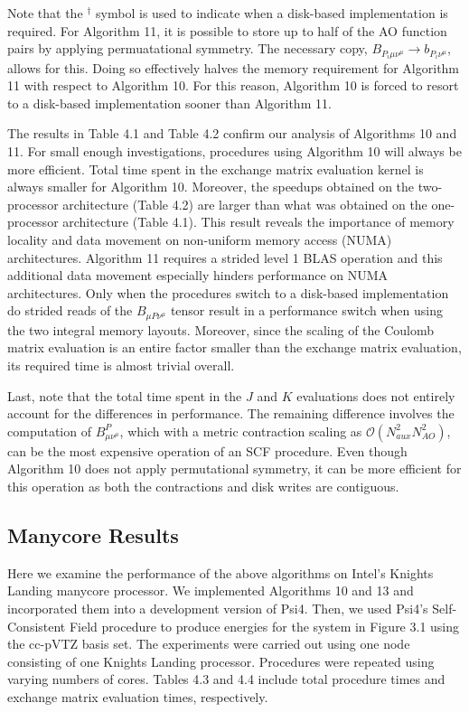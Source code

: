 Note that the $^{\dagger}$ symbol is used to indicate when a disk-based implementation is required. For Algorithm 11, it is possible
to store up to half of the AO function pairs by applying permuatational symmetry. The necessary copy, 
$B_{P_i \mu \nu^{\mu}} \rightarrow b_{P_i \nu^{\mu}}$, allows for this. Doing so effectively halves the memory requirement for Algorithm 11
with respect to Algorithm 10. For this reason, Algorithm 10 is forced to resort to a disk-based implementation sooner than Algorithm 11.

The results in Table 4.1 and Table 4.2 confirm our analysis of Algorithms 10 and 11. For small enough investigations, procedures using Algorithm 10 will always be more
efficient. Total time spent in the exchange matrix evaluation kernel is always smaller for Algorithm 10. 
Moreover, the speedups obtained on the two-processor architecture (Table 4.2) are larger than what was obtained on the one-processor architecture (Table 4.1).
This result reveals the importance of memory locality and data movement on non-uniform memory access (NUMA) architectures. Algorithm 11 requires a strided level 1 BLAS operation and 
this additional data movement especially hinders performance on NUMA architectures.
Only when the procedures switch to a disk-based implementation
do strided reads of the $B_{\mu P \nu^\mu}$ tensor result in a performance switch when using the two integral memory layouts. 
Moreover, since the scaling of the Coulomb matrix evaluation is an entire factor smaller than the exchange matrix evaluation, its required time is almost trivial overall.

Last, note that the total time spent in the $J$ and $K$ evaluations does not entirely account for the differences in performance. The 
remaining difference involves the computation of $B^P_{\mu \nu^\mu}$, which with a metric contraction scaling as 
$\mathcal{O}(N_{aux}^2N_{AO}^2)$, can be the most expensive operation of an SCF procedure. Even though Algorithm 10 does not 
apply permutational symmetry, it can be more efficient for this operation as both the contractions and disk writes are contiguous.


\subsection{Manycore Results}

Here we examine the performance of the above algorithms on Intel's Knights Landing manycore processor. 
We implemented Algorithms 10 and 13 and incorporated them into a development version of {\sc Psi4}. 
Then, we used {\sc Psi4}'s Self-Consistent Field procedure to produce energies for the system in Figure 3.1 using the cc-pVTZ basis set. 
The experiments were carried out using one node consisting of one Knights Landing processor. Procedures were repeated using varying numbers of cores.
Tables 4.3 and 4.4 include total procedure times and exchange matrix evaluation times, respectively.   

